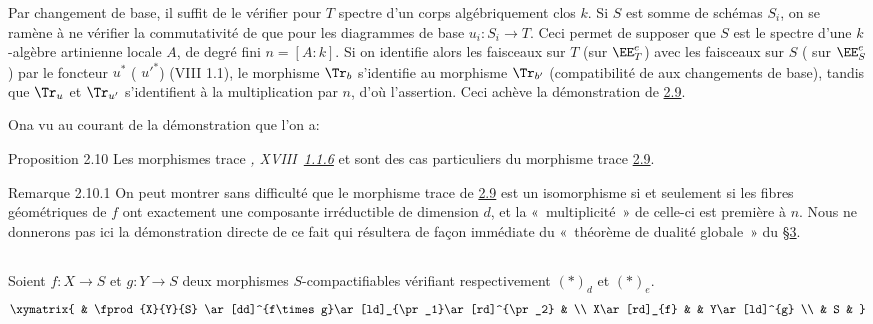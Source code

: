 Par changement de base, il suffit de le vérifier pour $T$ spectre d'un
corps algébriquement clos $k$. Si $S$ est somme de schémas $S_{i}$, on
se ramène à ne vérifier la commutativité de  que pour les
diagrammes  de base $u_{i}:S_{i}\rightarrow T$. Ceci permet de
supposer que $S$ est le spectre d'une $k$-algèbre artinienne locale
$A$, de degré fini $n=[A:k]$. Si on identifie alors les faisceaux sur
$T$ (\resp sur $\EE^{e}_{T}$) avec les faisceaux sur $S$ (\resp
sur $\EE^{e}_{S}$) par le foncteur $u^{\ast}$ (\resp
${u'}^{\ast}$) (VIII 1.1), le morphisme $\Tr_{b}$ s'identifie au
morphisme $\Tr_{b'}$ (compatibilité de  aux changements de
base), tandis que $\Tr_{u}$ et $\Tr_{u'}$ s'identifient à la
multiplication par $n$, d'où l'assertion. Ceci achève la démonstration
de \hyperref[XVIII.thm2.9]{2.9}.

On\pageoriginale a vu au courant de la démonstration que l'on a:

\begin{enonce*}{Proposition 2.10}
Les morphismes trace \emph{,
  XVIII~\hyperref[XVIII.prop1.1.6]{1.1.6}} et  sont des cas
  particuliers du morphisme trace \hyperref[XVIII.thm2.9]{2.9}.
\end{enonce*}

\begin{enonce*}[remark]{Remarque 2.10.1}
On peut montrer sans difficulté que le morphisme trace de
\hyperref[XVIII.thm2.9]{2.9} est un 
isomorphisme si et seulement si les fibres géométriques de $f$ ont
exactement une composante irréductible de dimension $d$, et la « multiplicité »  de celle-ci est première à $n$. Nous ne donnerons
pas ici la démonstration directe de ce fait qui résultera de façon
immédiate du « théorème de dualité globale »  du \S \hyperref[XVIII.sec3]{3}.
\end{enonce*}

\setcounter{subsection}{10}
\subsection{}
Soient $f:X\rightarrow S$ et $g:Y\rightarrow S$ deux morphismes
$S$-compactifiables vérifiant respectivement $(\ast)_{d}$ et
$(\ast)_{e}$.
$$
\xymatrix{
     & \fprod{X}{Y}{S} \ar[dd]^{f\times g}\ar[ld]_{\pr_1}\ar[rd]^{\pr_2} & \\
X\ar[rd]_{f} &                                        & Y\ar[ld]^{g} \\ 
             &    S                                   &
}
$$

